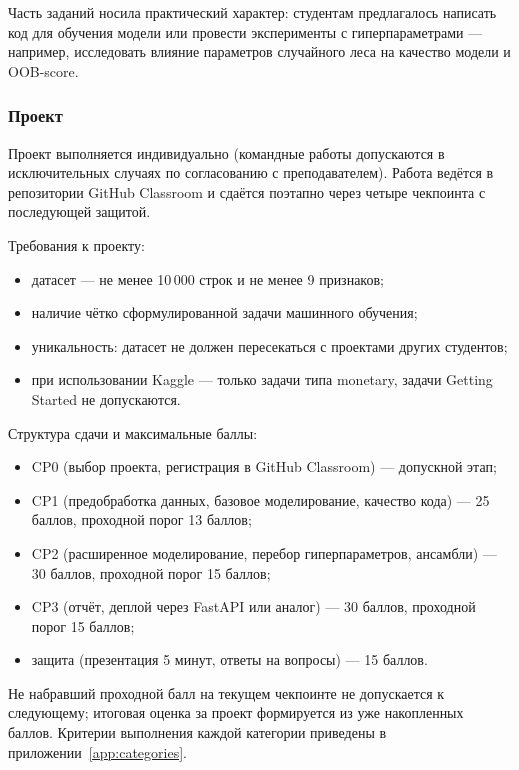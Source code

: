 Часть заданий носила практический характер: студентам предлагалось написать код для обучения модели или провести эксперименты с гиперпараметрами --- например, исследовать влияние параметров случайного леса на качество модели и OOB-score.

\subsubsection{Проект}\label{sec:project}

Проект выполняется индивидуально (командные работы допускаются в исключительных случаях по согласованию с преподавателем). Работа ведётся в репозитории GitHub Classroom и сдаётся поэтапно через четыре чекпоинта с последующей защитой.

Требования к проекту:
\begin{itemize}
    \item датасет --- не менее 10\,000 строк и не менее 9 признаков;
    \item наличие чётко сформулированной задачи машинного обучения;
    \item уникальность: датасет не должен пересекаться с проектами других студентов;
    \item при использовании Kaggle --- только задачи типа monetary, задачи Getting Started не допускаются.
\end{itemize}

Структура сдачи и максимальные баллы:

\begin{itemize}
    \item CP0 (выбор проекта, регистрация в GitHub Classroom) --- допускной этап;
    \item CP1 (предобработка данных, базовое моделирование, качество кода) --- 25 баллов, проходной порог 13 баллов;
    \item CP2 (расширенное моделирование, перебор гиперпараметров, ансамбли) --- 30 баллов, проходной порог 15 баллов;
    \item CP3 (отчёт, деплой через FastAPI или аналог) --- 30 баллов, проходной порог 15 баллов;
    \item защита (презентация 5 минут, ответы на вопросы) --- 15 баллов.
\end{itemize}

Не набравший проходной балл на текущем чекпоинте не допускается к следующему; итоговая оценка за проект формируется из уже накопленных баллов.
Критерии выполнения каждой категории приведены в приложении~\ref{app:categories}.

